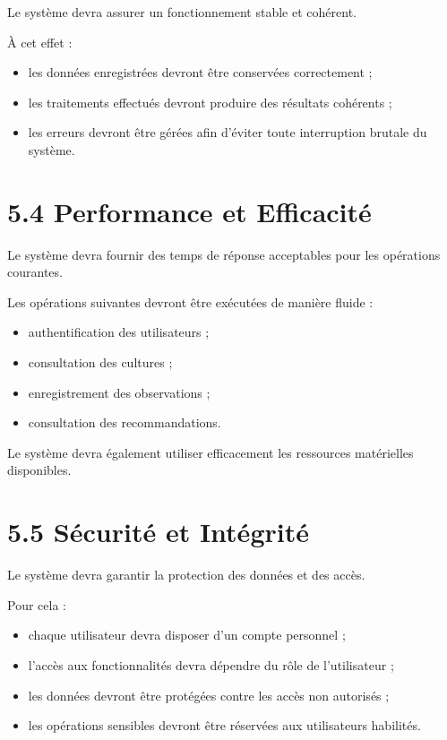 \documentclass[12pt,a4paper]{report}
\begin{document}
Le système devra assurer un fonctionnement stable et cohérent.

À cet effet :

\begin{itemize}
\item
  les données enregistrées devront être conservées correctement ;
\item
  les traitements effectués devront produire des résultats cohérents ;
\item
  les erreurs devront être gérées afin d'éviter toute interruption
  brutale du système.
\end{itemize}

\section{5.4 Performance et
Efficacité}\label{performance-et-efficacituxe9}

Le système devra fournir des temps de réponse acceptables pour les
opérations courantes.

Les opérations suivantes devront être exécutées de manière fluide :

\begin{itemize}
\item
  authentification des utilisateurs ;
\item
  consultation des cultures ;
\item
  enregistrement des observations ;
\item
  consultation des recommandations.
\end{itemize}

Le système devra également utiliser efficacement les ressources
matérielles disponibles.

\section{5.5 Sécurité et
Intégrité}\label{suxe9curituxe9-et-intuxe9grituxe9}

Le système devra garantir la protection des données et des accès.

Pour cela :

\begin{itemize}
\item
  chaque utilisateur devra disposer d'un compte personnel ;
\item
  l'accès aux fonctionnalités devra dépendre du rôle de l'utilisateur ;
\item
  les données devront être protégées contre les accès non autorisés ;
\item
  les opérations sensibles devront être réservées aux utilisateurs
  habilités.
\end{itemize}
\end{document}
